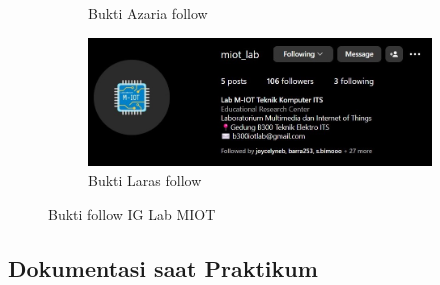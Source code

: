 \begin{enumerate}
\begin{figure}[H]
\begin{subfigure}{0.3\linewidth}
			\caption{Bukti Azaria follow}
			\label{fig:gambar36}
		\end{subfigure}
		\begin{subfigure}{0.8\linewidth}
			\centering
			\includegraphics[width=\linewidth]{P1/img/larasfollow.jpg}
			\caption{Bukti Laras follow}
			\label{fig:gambar37}
		\end{subfigure}
		\caption{Bukti follow IG Lab MIOT}
		\label{fig:dua_gambar}
	\end{figure}
	
\end{enumerate}

\subsection{Dokumentasi saat Praktikum}
